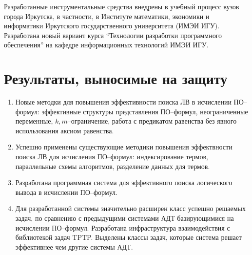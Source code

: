 Разработанные инструментальные средства внедрены в учебный процесс вузов города Иркутска, в частности, в Институте математики, экономики и информатики Иркутского государственного университета (ИМЭИ ИГУ). Разработана новый вариант курса ``Технологии разработки программного обеспечения'' на кафедре информационных технологий ИМЭИ ИГУ.



\section*{Результаты, выносимые на защиту} 
\begin{enumerate}

\item Новые методки для повышения эффективности поиска ЛВ в исчислении ПО--формул: эффективные структуры представления ПО--формул,  неограниченные переменные, $k,m$--ограничение, работа с предикатом равенства без явного использования аксиом равенства. 

\item Успешно применены существующие методики повышения эффектвности поиска ЛВ для исчисления ПО--формул: индексирование термов, параллельные схемы алгоритмов, разделение данных для термов.  

\item Разработана программная система для эффективного поиска логического вывода в исчислении ПО--формул.

\item Для разработанной системы значительно расширен класс успешно решаемых задач, по сравнению с предыдущими системами АДТ базирующимися на исчислении ПО--формул. Разработана инфраструктура взаимодействия с библиотекой задач TPTP. Выделены классы задач, которые система решает эффективнее чем другие системы АДТ.
\end{enumerate}



